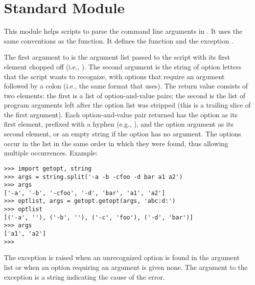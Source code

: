 \section{Standard Module }

This module helps scripts to parse the command line arguments in
.
It uses the same conventions as the \UNIX{}
function.
It defines the function
and the exception
.

The first argument to
is the argument list passed to the script with its first element
chopped off (i.e.,
).
The second argument is the string of option letters that the
script wants to recognize, with options that require an argument
followed by a colon (i.e., the same format that \UNIX{}
uses).
The return value consists of two elements: the first is a list of
option-and-value pairs; the second is the list of program arguments
left after the option list was stripped (this is a trailing slice of the
first argument).
Each option-and-value pair returned has the option as its first element,
prefixed with a hyphen (e.g.,
),
and the option argument as its second element, or an empty string if the
option has no argument.
The options occur in the list in the same order in which they were
found, thus allowing multiple occurrences.
Example:

\bcode\begin{verbatim}
>>> import getopt, string
>>> args = string.split('-a -b -cfoo -d bar a1 a2')
>>> args
['-a', '-b', '-cfoo', '-d', 'bar', 'a1', 'a2']
>>> optlist, args = getopt.getopt(args, 'abc:d:')
>>> optlist
[('-a', ''), ('-b', ''), ('-c', 'foo'), ('-d', 'bar')]
>>> args
['a1', 'a2']
>>> 
\end{verbatim}\ecode

The exception
is raised when an unrecognized option is found in the argument list or
when an option requiring an argument is given none.
The argument to the exception is a string indicating the cause of the
error.
